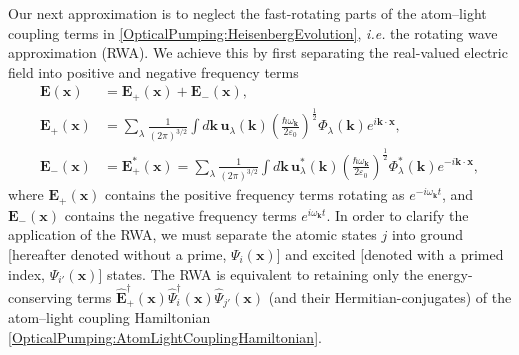 Our next approximation is to neglect the fast-rotating parts of the atom--light coupling terms in \eqref{OpticalPumping:HeisenbergEvolution}, \emph{i.e.} the rotating wave approximation (RWA).  We achieve this by first separating the real-valued electric field into positive and negative frequency terms
\begin{align}
    \bm{E}(\bm{x}) &= \bm{E}_+(\bm{x}) + \bm{E}_-(\bm{x}), \\
    \bm{E}_+(\bm{x}) &= \sum_\lambda \frac{1}{(2\pi)^{3/2}} \int d \bm{k}\, \bm{u}_\lambda(\bm{k}) \left(\frac{\hbar \omega_{\bm{k}}}{2 \varepsilon_0}\right)^{\frac{1}{2}} \Phi_\lambda(\bm{k}) e^{i \bm{k} \cdot \bm{x}},\\
    \bm{E}^{\phantom{*}}_-(\bm{x}) &= \bm{E}_+^*(\bm{x}) = \sum_\lambda \frac{1}{(2\pi)^{3/2}} \int d \bm{k}\, \bm{u}^*_\lambda(\bm{k}) \left(\frac{\hbar \omega_{\bm{k}}}{2 \varepsilon_0}\right)^{\frac{1}{2}} \Phi^*_\lambda(\bm{k}) e^{-i \bm{k} \cdot \bm{x}},
\end{align}
where $\bm{E}_+(\bm{x})$ contains the positive frequency terms rotating as $e^{-i \omega_{\bm{k}} t}$, and $\bm{E}_-(\bm{x})$ contains the negative frequency terms $e^{i \omega_{\bm{k}} t}$.  In order to clarify the application of the RWA, we must separate the atomic states $j$ into ground [hereafter denoted without a prime, $\Psi_i(\bm{x})$] and excited [denoted with a primed index, $\Psi_{i'}(\bm{x})$] states.  The RWA is equivalent to retaining only the energy-conserving terms $\hat{\bm{E}}_+^\dagger(\bm{x})\hat{\Psi}_i^\dagger(\bm{x}) \hat{\Psi}_{j'}(\bm{x})$ (and their Hermitian-conjugates) of the atom--light coupling Hamiltonian \eqref{OpticalPumping:AtomLightCouplingHamiltonian}.  


